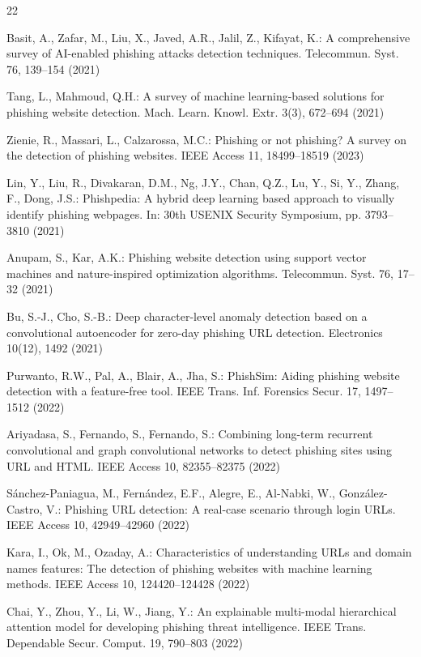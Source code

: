 \documentclass{llncs}
\begin{document}
\begin{thebibliography}{22}

Basit, A., Zafar, M., Liu, X., Javed, A.R., Jalil, Z., Kifayat, K.: A comprehensive survey of AI-enabled phishing attacks detection techniques. Telecommun. Syst. 76, 139--154 (2021)

Tang, L., Mahmoud, Q.H.: A survey of machine learning-based solutions for phishing website detection. Mach. Learn. Knowl. Extr. 3(3), 672--694 (2021)

Zienie, R., Massari, L., Calzarossa, M.C.: Phishing or not phishing? A survey on the detection of phishing websites. IEEE Access 11, 18499--18519 (2023)

Lin, Y., Liu, R., Divakaran, D.M., Ng, J.Y., Chan, Q.Z., Lu, Y., Si, Y., Zhang, F., Dong, J.S.: Phishpedia: A hybrid deep learning based approach to visually identify phishing webpages. In: 30th USENIX Security Symposium, pp. 3793--3810 (2021)

Anupam, S., Kar, A.K.: Phishing website detection using support vector machines and nature-inspired optimization algorithms. Telecommun. Syst. 76, 17--32 (2021)

Bu, S.-J., Cho, S.-B.: Deep character-level anomaly detection based on a convolutional autoencoder for zero-day phishing URL detection. Electronics 10(12), 1492 (2021)

Purwanto, R.W., Pal, A., Blair, A., Jha, S.: PhishSim: Aiding phishing website detection with a feature-free tool. IEEE Trans. Inf. Forensics Secur. 17, 1497--1512 (2022)

Ariyadasa, S., Fernando, S., Fernando, S.: Combining long-term recurrent convolutional and graph convolutional networks to detect phishing sites using URL and HTML. IEEE Access 10, 82355--82375 (2022)

S{\'a}nchez-Paniagua, M., Fern{\'a}ndez, E.F., Alegre, E., Al-Nabki, W., Gonz{\'a}lez-Castro, V.: Phishing URL detection: A real-case scenario through login URLs. IEEE Access 10, 42949--42960 (2022)

Kara, I., Ok, M., Ozaday, A.: Characteristics of understanding URLs and domain names features: The detection of phishing websites with machine learning methods. IEEE Access 10, 124420--124428 (2022)

Chai, Y., Zhou, Y., Li, W., Jiang, Y.: An explainable multi-modal hierarchical attention model for developing phishing threat intelligence. IEEE Trans. Dependable Secur. Comput. 19, 790--803 (2022)


\end{thebibliography}
\end{document}
